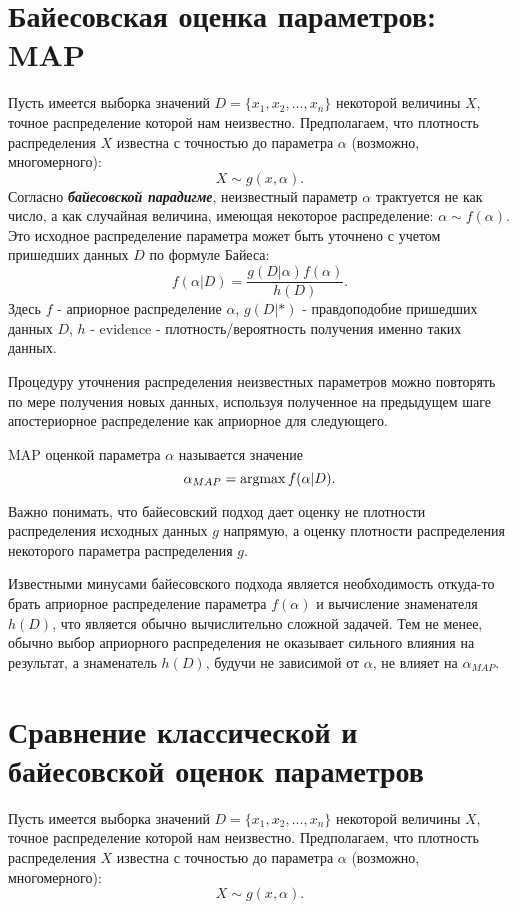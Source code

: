 \section{Байесовская оценка параметров: MAP}

Пусть имеется выборка значений $D = \{x_1, x_2, ..., x_n\}$ некоторой величины $X$, точное распределение которой нам неизвестно. Предполагаем, что плотность распределения $X$ известна с точностью до параметра $\alpha$ (возможно, многомерного): 
$$
X \sim g(x, \alpha).
$$
Согласно \textbf{\textit{байесовской парадигме}}, неизвестный параметр $\alpha$ трактуется не как число, а как случайная величина, имеющая некоторое распределение: $\alpha \sim f(\alpha)$. Это исходное распределение параметра может быть уточнено с учетом пришедших данных $D$ по формуле Байеса:
$$
f(\alpha | D) = \frac{g(D | \alpha)f(\alpha)}{h(D)}.
$$
Здесь $f$ - априорное распределение $\alpha$, $g(D | *)$ - правдоподобие пришедших данных $D$, 
$h$ - evidence - плотность/вероятность получения именно таких данных.

Процедуру уточнения распределения неизвестных параметров можно повторять по мере получения новых данных, используя полученное на предыдущем шаге апостериорное распределение как априорное для следующего.

MAP оценкой параметра $\alpha$ называется значение
$$
\alpha_{MAP} = \operatorname*{argmax} f(\alpha | D).
$$

Важно понимать, что байесовский подход дает оценку не плотности распределения исходных данных $g$ напрямую, а оценку плотности распределения некоторого параметра распределения $g$.

Известными минусами байесовского подхода является необходимость откуда-то брать априорное распределение параметра $f(\alpha)$ и вычисление знаменателя $h(D)$, что является обычно вычислительно сложной задачей. Тем не менее, обычно выбор априорного распределения не оказывает сильного влияния на результат, а знаменатель $h(D)$, будучи не зависимой от $\alpha$, не влияет на $\alpha_{MAP}$.


\section{Сравнение классической и байесовской оценок параметров}

Пусть имеется выборка значений $D = \{x_1, x_2, ..., x_n\}$ некоторой величины $X$, точное распределение которой нам неизвестно. Предполагаем, что плотность распределения $X$ известна с точностью до параметра $\alpha$ (возможно, многомерного): 
$$
X \sim g(x, \alpha).
$$

